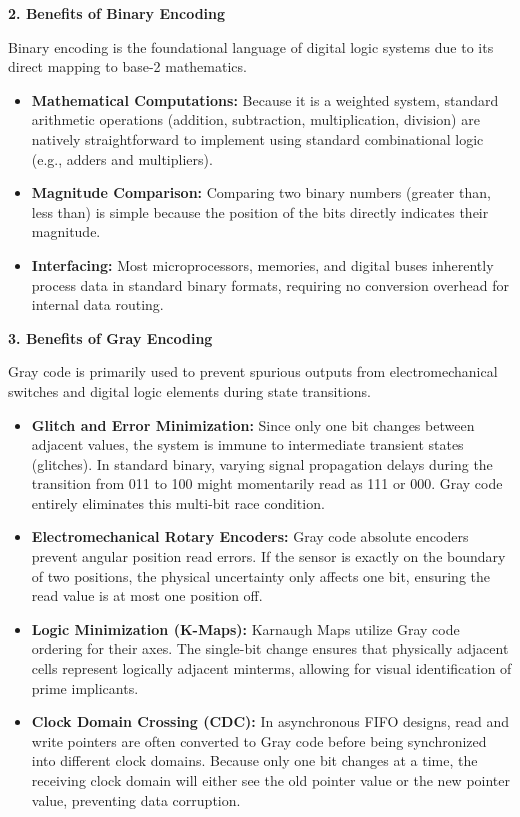 \documentclass[12pt,a3paper]{article}
\begin{document}
\begin{enumerate}
\begin{tcolorbox}[enhanced,breakable,ansbox,colback=cD!4,colframe=cD,boxrule=0.8pt,arc=5pt,title={\textbf{Answer}},fonttitle=\bfseries\color{white},colbacktitle=cD]
\vspace{1em}
\textbf{\textcolor{cD}{2. Benefits of Binary Encoding}}

Binary encoding is the foundational language of digital logic systems due to its direct mapping to base-2 mathematics.
\begin{itemize}
    \item \textbf{Mathematical Computations:} Because it is a weighted system, standard arithmetic operations (addition, subtraction, multiplication, division) are natively straightforward to implement using standard combinational logic (e.g., adders and multipliers).
    \item \textbf{Magnitude Comparison:} Comparing two binary numbers (greater than, less than) is simple because the position of the bits directly indicates their magnitude.
    \item \textbf{Interfacing:} Most microprocessors, memories, and digital buses inherently process data in standard binary formats, requiring no conversion overhead for internal data routing.
\end{itemize}

\vspace{1em}
\textbf{\textcolor{cD}{3. Benefits of Gray Encoding}}

Gray code is primarily used to prevent spurious outputs from electromechanical switches and digital logic elements during state transitions.
\begin{itemize}
    \item \textbf{Glitch and Error Minimization:} Since only one bit changes between adjacent values, the system is immune to intermediate transient states (glitches). In standard binary, varying signal propagation delays during the transition from 011 to 100 might momentarily read as 111 or 000. Gray code entirely eliminates this multi-bit race condition.
    \item \textbf{Electromechanical Rotary Encoders:} Gray code absolute encoders prevent angular position read errors. If the sensor is exactly on the boundary of two positions, the physical uncertainty only affects one bit, ensuring the read value is at most one position off.
    \item \textbf{Logic Minimization (K-Maps):} Karnaugh Maps utilize Gray code ordering for their axes. The single-bit change ensures that physically adjacent cells represent logically adjacent minterms, allowing for visual identification of prime implicants.
    \item \textbf{Clock Domain Crossing (CDC):} In asynchronous FIFO designs, read and write pointers are often converted to Gray code before being synchronized into different clock domains. Because only one bit changes at a time, the receiving clock domain will either see the old pointer value or the new pointer value, preventing data corruption.
\end{itemize}


\end{tcolorbox}
\end{enumerate}
\end{document}
